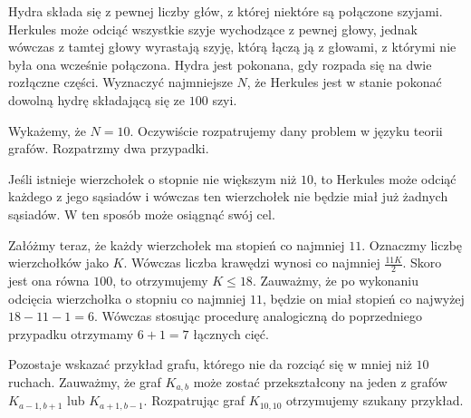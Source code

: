 \vspace{5px}

\begin{problem}{6}
	Hydra składa się z pewnej liczby głów, z której niektóre są połączone szyjami. Herkules może odciąć wszystkie szyje wychodzące z pewnej głowy, jednak wówczas z tamtej głowy wyrastają szyję, którą łączą ją z głowami, z którymi nie była ona wcześnie połączona. Hydra jest pokonana, gdy rozpada się na dwie rozłączne części. Wyznaczyć najmniejsze $N$, że Herkules jest w stanie pokonać dowolną hydrę składającą się ze $100$ szyi.
\end{problem}

\noindent
Wykażemy, że $N = 10$. Oczywiście rozpatrujemy dany problem w języku teorii grafów. Rozpatrzmy dwa przypadki.

Jeśli istnieje wierzchołek o stopnie nie większym niż $10$, to Herkules może odciąć każdego z jego sąsiadów i wówczas ten wierzchołek nie będzie miał już żadnych sąsiadów. W ten sposób może osiągnąć swój cel.

Załóżmy teraz, że każdy wierzchołek ma stopień co najmniej $11$. Oznaczmy liczbę wierzchołków jako $K$. Wówczas liczba krawędzi wynosi co najmniej $\frac{11K}{2}$. Skoro jest ona równa $100$, to otrzymujemy $K \leqslant 18$. Zauważmy, że po wykonaniu odcięcia wierzchołka o stopniu co najmniej $11$, będzie on miał stopień co najwyżej $18 - 11 - 1 = 6$. Wówczas stosując procedurę analogiczną do poprzedniego przypadku otrzymamy $6 + 1 = 7$ łącznych cięć.


Pozostaje wskazać przykład grafu, którego nie da rozciąć się w mniej niż $10$ ruchach. Zauważmy, że graf $K_{a,b}$ może zostać przekształcony na jeden z grafów $K_{a - 1,b + 1}$ lub $K_{a + 1,b - 1}$. Rozpatrując graf $K_{10,10}$ otrzymujemy szukany przykład.

